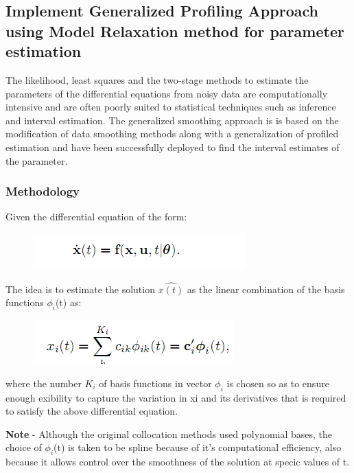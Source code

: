 \documentclass[11pt]{article}
\makeatletter
\def\maxwidth{\ifdim\Gin@nat@width>\linewidth\linewidth
    \else\Gin@nat@width\fi}
\let\Oldincludegraphics\includegraphics
\renewcommand{\includegraphics}[1]{\Oldincludegraphics[width=.8\maxwidth]{#1}}
\makeatother
\begin{document}
    \subsection{Implement Generalized Profiling Approach using Model
Relaxation method for parameter
estimation}\label{implement-generalized-profiling-approach-using-model-relaxation-method-for-parameter-estimation}

The likelihood, least squares and the two-stage methods to estimate the
parameters of the differential equations from noisy data are
computationally intensive and are often poorly suited to statistical
techniques such as inference and interval estimation. The generalized
smoothing approach is is based on the modification of data smoothing
methods along with a generalization of profiled estimation and have been
successfully deployed to find the interval estimates of the parameter.

\subsubsection{Methodology}\label{methodology}

Given the differential equation of the form:

\begin{figure}[htbp]
\centering
\includegraphics{images/smoothing_1.png}
\caption{}
\end{figure}

    The idea is to estimate the solution \(\hat{x(t)}\) as the linear
combination of the basis functions \(\phi_{i}\)(t) as:

\begin{figure}[htbp]
\centering
\includegraphics{images/smoothing_2.png}
\caption{}
\end{figure}

    where the number \(K_{i}\) of basis functions in vector \(\phi_{i}\) is
chosen so as to ensure enough exibility to capture the variation in xi
and its derivatives that is required to satisfy the above differential
equation.

\textbf{Note} - Although the original collocation methods used
polynomial bases, the choice of \(\phi_{i}\)(t) is taken to be spline
because of it's computational efficiency, also because it allows control
over the smoothness of the solution at specic values of t.
\end{document}
